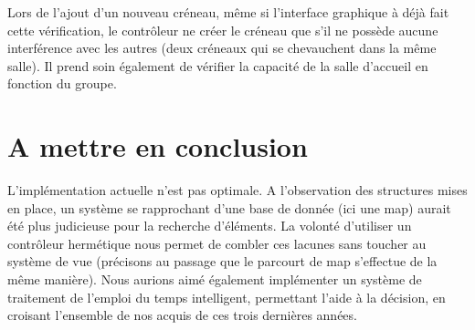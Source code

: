 \documentclass[a4paper,11pt]{report}
\begin{document}
		Lors de l'ajout d'un nouveau créneau, même si l'interface graphique à déjà fait cette vérification, le contrôleur ne créer le créneau que s'il ne possède aucune interférence avec les autres (deux créneaux qui se chevauchent dans la même salle). Il prend soin également de vérifier la capacité de la salle d'accueil en fonction du groupe.
		
	\part{A mettre en conclusion}
		L'implémentation actuelle n'est pas optimale. A l'observation des structures mises en place, un système se rapprochant d'une base de donnée (ici une map) aurait été plus judicieuse pour la recherche d'éléments. La volonté d'utiliser un contrôleur hermétique nous permet de combler ces lacunes sans toucher au système de vue (précisons au passage que le parcourt de map s'effectue de la même manière).
		Nous aurions aimé également implémenter un système de traitement de l'emploi du temps intelligent, permettant l'aide à la décision, en croisant l'ensemble de nos acquis de ces trois dernières années.
\end{document}
